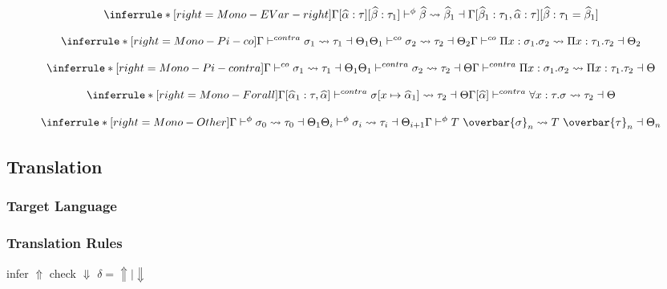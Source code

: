 \[
\inferrule*[right=Mono-EVar-right]
{ }
{\Gamma[\genA:\tau][\genB:\tau_1] \cocontra \genB \bemono \genB_1 \dashv \Gamma[\genB_1:\tau_1, \genA:\tau][\genB :\tau_1= \genB_1]}
\]

\[
\inferrule*[right=Mono-Pi-co]
{\Gamma \contra \sigma_1 \bemono \tau_1 \dashv \Theta_1 \\
\Theta_1 \co \sigma_2 \bemono \tau_2 \dashv \Theta_2
}
{\Gamma \co \Pi x: \sigma_1. \sigma_2 \bemono \Pi x:\tau_1. \tau_2 \dashv \Theta_2}
\]

\[
\inferrule*[right=Mono-Pi-contra]
{
\Gamma \co \sigma_1 \bemono \tau_1 \dashv \Theta_1 \\
\Theta_1 \contra \sigma_2 \bemono \tau_2 \dashv \Theta}
{\Gamma \contra \Pi x: \sigma_1. \sigma_2 \bemono \Pi x:\tau_1. \tau_2 \dashv \Theta}
\]

\[
\inferrule*[right=Mono-Forall]
{\Gamma[\genA_1 : \tau,\genA] \contra \sigma[ x \mapsto \genA_1] \bemono \tau_2 \dashv \Theta}
{\Gamma[\genA] \contra \forall x : \tau. \sigma \bemono \tau_2 \dashv \Theta}
\]

\[
\inferrule*[right=Mono-Other]
{ \Gamma \cocontra \sigma_0 \bemono \tau_0 \dashv \Theta_1 \\
\Theta_i \cocontra \sigma_i \bemono \tau_i \dashv \Theta_{i+1}
}
{ \Gamma \cocontra T~\overbar{\sigma}_n \bemono T~\overbar{\tau}_n \dashv \Theta_n}
\]

\clearpage


\iffalse
\subsection{Translation}

\newcommand{\transto}[1]{\leadsto#1}
\newcommand{\translated}[1]{|#1|}
\newcommand{\cyancolorbox}[1]{\colorbox{cyan!30}{$#1$}}
\newcommand{\invariant}[2]{}

\subsubsection{Target Language}

\gram{\ottE\ottinterrule}

\subsubsection{Translation Rules}

\framebox{$ \infercheck e : \rho \invariant{E}{|\rho|}$ } infer $\Uparrow$ check $\Downarrow$ $\delta = \Uparrow \mid \Downarrow$

